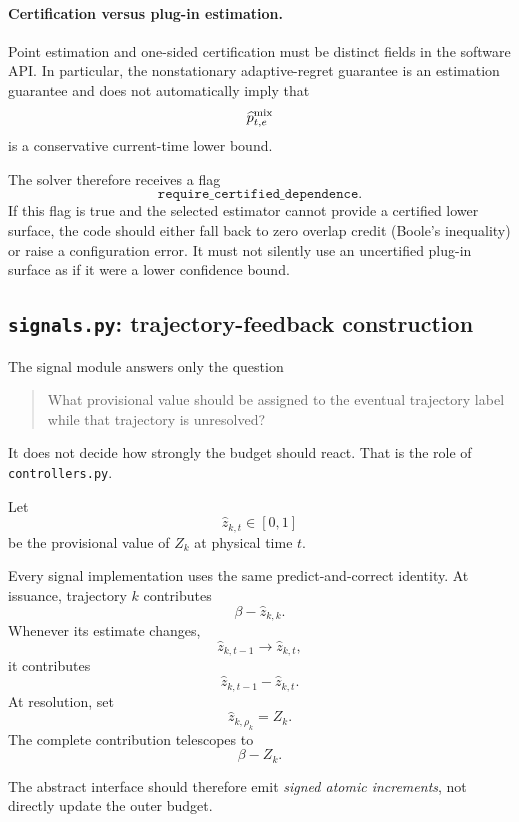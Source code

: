 \documentclass[11pt]{article}
\begin{document}
\paragraph{Certification versus plug-in estimation.}

Point estimation and one-sided certification must be distinct fields in the
software API.  In particular, the nonstationary adaptive-regret guarantee is
an estimation guarantee and does not automatically imply that
\[
    \widehat p^{\rm mix}_{t,e}
\]
is a conservative current-time lower bound.

The solver therefore receives a flag
\[
    \texttt{require\_certified\_dependence}.
\]
If this flag is true and the selected estimator cannot provide a certified
lower surface, the code should either fall back to zero overlap credit
(Boole's inequality) or raise a configuration error.  It must not silently
use an uncertified plug-in surface as if it were a lower confidence bound.

\subsection{\texttt{signals.py}: trajectory-feedback construction}
\label{app:signals-module}

The signal module answers only the question

\begin{quote}
What provisional value should be assigned to the eventual trajectory label
while that trajectory is unresolved?
\end{quote}

It does not decide how strongly the budget should react.  That is the role of
\texttt{controllers.py}.

Let
\[
    \widehat z_{k,t}\in[0,1]
\]
be the provisional value of $Z_k$ at physical time $t$.

Every signal implementation uses the same predict-and-correct identity.  At
issuance, trajectory $k$ contributes
\[
    \beta-\widehat z_{k,k}.
\]
Whenever its estimate changes,
\[
    \widehat z_{k,t-1}
    \longrightarrow
    \widehat z_{k,t},
\]
it contributes
\[
    \widehat z_{k,t-1}
    -
    \widehat z_{k,t}.
\]
At resolution, set
\[
    \widehat z_{k,\rho_k}=Z_k.
\]
The complete contribution telescopes to
\[
    \beta-Z_k.
\]

The abstract interface should therefore emit \emph{signed atomic increments},
not directly update the outer budget.
\end{document}
